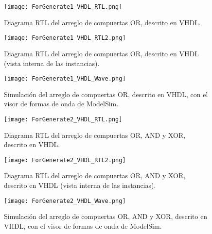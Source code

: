 \begin{figure}[ht]
	\centering
	\texttt{[image: ForGenerate1\_VHDL\_RTL.png]}
	\caption{Diagrama RTL del arreglo de compuertas OR, descrito en VHDL. \label{fig:forgenerate1_verilog_rtl}}
\end{figure}

\begin{figure}[ht]
	\centering
	\texttt{[image: ForGenerate1\_VHDL\_RTL2.png]}
	\caption{Diagrama RTL del arreglo de compuertas OR, descrito en VHDL (vista interna de las instancias). \label{fig:forgenerate1_verilog_rtl2}}
\end{figure}

\begin{figure}[ht]
	\centering
	\texttt{[image: ForGenerate1\_VHDL\_Wave.png]}
	\caption{Simulación del arreglo de compuertas OR, descrito en VHDL, con el visor de formas de onda de ModelSim. \label{fig:forgenerate1_verilog_wave}}
\end{figure}

\begin{figure}[ht]
	\centering
	\texttt{[image: ForGenerate2\_VHDL\_RTL.png]}
	\caption{Diagrama RTL del arreglo de compuertas OR, AND y XOR, descrito en VHDL. \label{fig:forgenerate2_verilog_rtl}}
\end{figure}

\begin{figure}[ht]
	\centering
	\texttt{[image: ForGenerate2\_VHDL\_RTL2.png]}
	\caption{Diagrama RTL del arreglo de compuertas OR, AND y XOR, descrito en VHDL (vista interna de las instancias). \label{fig:forgenerate2_verilog_rtl2}}
\end{figure}

\begin{figure}[ht]
	\centering
	\texttt{[image: ForGenerate2\_VHDL\_Wave.png]}
	\caption{Simulación del arreglo de compuertas OR, AND y XOR, descrito en VHDL, con el visor de formas de onda de ModelSim. \label{fig:forgenerate2_verilog_wave}}
\end{figure}